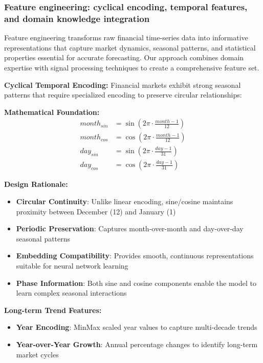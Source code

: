 \documentclass[conference]{IEEEtran}
\begin{document}
\subsubsection{Feature engineering: cyclical encoding, temporal features, and domain knowledge integration}

Feature engineering transforms raw financial time-series data into informative representations that capture market dynamics, seasonal patterns, and statistical properties essential for accurate forecasting. Our approach combines domain expertise with signal processing techniques to create a comprehensive feature set.

\textbf{Cyclical Temporal Encoding:}
Financial markets exhibit strong seasonal patterns that require specialized encoding to preserve circular relationships:

\textbf{Mathematical Foundation:}
\begin{align}
month_{sin} &= \sin\left(2\pi \cdot \frac{month - 1}{12}\right) \\
month_{cos} &= \cos\left(2\pi \cdot \frac{month - 1}{12}\right) \\
day_{sin} &= \sin\left(2\pi \cdot \frac{day - 1}{31}\right) \\
day_{cos} &= \cos\left(2\pi \cdot \frac{day - 1}{31}\right)
\end{align}

\textbf{Design Rationale:}
\begin{itemize}
  \item \textbf{Circular Continuity}: Unlike linear encoding, sine/cosine maintains proximity between December (12) and January (1)
  \item \textbf{Periodic Preservation}: Captures month-over-month and day-over-day seasonal patterns
  \item \textbf{Embedding Compatibility}: Provides smooth, continuous representations suitable for neural network learning
  \item \textbf{Phase Information}: Both sine and cosine components enable the model to learn complex seasonal interactions
\end{itemize}

\textbf{Long-term Trend Features:}
\begin{itemize}
  \item \textbf{Year Encoding}: MinMax scaled year values to capture multi-decade trends
  \item \textbf{Year-over-Year Growth}: Annual percentage changes to identify long-term market cycles
\end{itemize}
\end{document}
